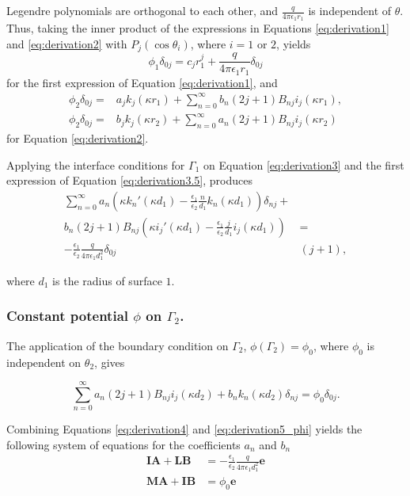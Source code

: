 Legendre polynomials are orthogonal to each other, and $\frac{q}{4\pi\epsilon_1 r_1}$ is independent of $\theta$. Thus, taking the inner product of the expressions in Equations \eqref{eq:derivation1} and  \eqref{eq:derivation2} with $P_j(\cos \theta_i)$, where $i=1$ or $2$, yields
%
\begin{equation} \label{eq:derivation3}
\phi_1\delta_{0j} = c_j r_1^j + \frac{q}{4\pi\epsilon_1 r_1} \delta_{0j}  
\end{equation}
\noindent for the first expression of Equation \eqref{eq:derivation1}, and
%
\begin{align} \label{eq:derivation3.5}
\phi_2\delta_{0j} = &a_j k_j(\kappa r_1) + \sum_{n=0}^{\infty} b_n(2j+1)B_{nj} i_j(\kappa r_1),  \nonumber \\
\phi_2\delta_{0j} = &b_j k_j(\kappa r_2) + \sum_{n=0}^{\infty} a_n(2j+1)B_{nj} i_j(\kappa r_2)  
\end{align}
\noindent for Equation \eqref{eq:derivation2}.

Applying the interface conditions for $\Gamma_1$ on Equation \eqref{eq:derivation3} and the first expression of Equation \eqref{eq:derivation3.5}, produces
%
\begin{align}\label{eq:derivation4}
\sum_{n=0}^{\infty} a_n \left( \kappa k_{n}'(\kappa d_1) - \frac{\epsilon_1}{\epsilon_2} \frac{n}{d_1} k_n(\kappa d_1) \right) \delta_{nj} +& \nonumber \\ 
b_n (2j+1)B_{nj} \left( \kappa i_{j}'(\kappa d_1) - \frac{\epsilon_1}{\epsilon_2} \frac{j}{d_1} i_j(\kappa d_1)  \right) & = \nonumber \\
-\frac{\epsilon_1}{\epsilon_2} \frac{q}{4\pi\epsilon_1 d_1^2} \delta_{0j}&(j+1),
\end{align}

\noindent where $d_1$ is the radius of surface $1$.

\subsubsection*{Constant potential $\phi$ on $\Gamma_2$.}
The application of the boundary condition on $\Gamma_2$, $\phi(\Gamma_2) = \phi_0$, where $\phi_0$ is independent on $\theta_2$, gives

\begin{equation} \label{eq:derivation5_phi}
\sum_{n=0}^{\infty} a_n(2j+1)B_{nj}i_j(\kappa d_2) + b_nk_n(\kappa d_2) \delta_{nj} = \phi_0 \delta_{0j}.
\end{equation}

\noindent Combining Equations \eqref{eq:derivation4} and  \eqref{eq:derivation5_phi} yields the following system of equations for the coefficients $a_n$ and $b_n$
%
\begin{align} \label{eq:system_phi}
\mathbf{I} \mathbf{A} + \mathbf{L} \mathbf{B} &= -\frac{\epsilon_1}{\epsilon_2} \frac{q}{4\pi\epsilon_1 d_1^2} \mathbf{e} \nonumber \\
\mathbf{M} \mathbf{A} + \mathbf{I} \mathbf{B} &= \phi_0 \mathbf{e}
\end{align}

